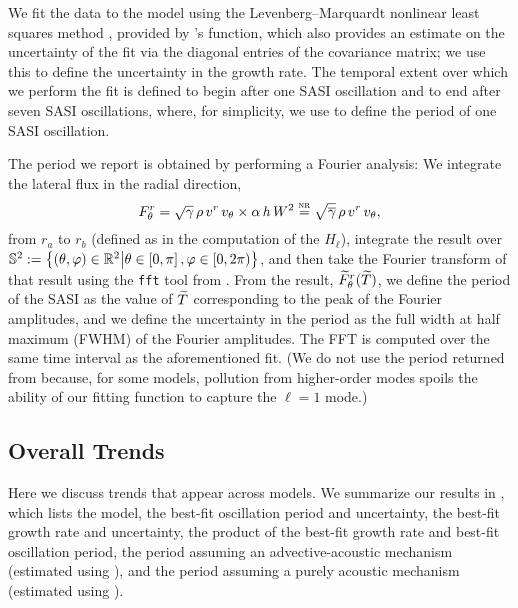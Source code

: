 We fit the data to the model using the Levenberg--Marquardt nonlinear
least squares method \citep[e.g., see][]{m1978},
provided by \scipy 's \curvefit{} function,
which also provides an estimate on the uncertainty of the fit via the diagonal
entries of the covariance matrix; we use this to define the uncertainty
in the growth rate.
The temporal extent over which we perform the fit is defined to begin
after one SASI oscillation and to end after seven SASI oscillations,
where, for simplicity, we use  to define the period of one
SASI oscillation.

The period we report is obtained by performing a Fourier analysis:
We integrate the lateral flux in the radial direction,
\begin{equation}
  F^{r}_{\theta}=\sqrt{\gamma}\,\rho\,v^{r}\,v_{\theta}\times\alpha\,h\,W^{2}
  \stackrel{\textsc{nr}}{=}\sqrt{\overline{\gamma}}\,\rho\,v^{r}\,v_{\theta},
  \label{eq.F12}
\end{equation}
from $r_{a}$ to $r_{b}$ (defined as in the computation of the $H_{\ell}$),
integrate the result over
$\mathbb{S}^{2}:=\left\{\left(\theta,\varphi\right)\in\mathbb{R}^{2}
\big|\theta\in\left[0,\pi\right],\varphi\in\left[0,2\pi\right)\right\}$,
and then take the Fourier transform of that result
using the \texttt{fft} tool from \scipy.
From the result, $\widetilde{F}^{r}_{\theta}(\widetilde{T})$,
we define the period of the SASI as the value of $\widetilde{T}$ corresponding to the
peak of the Fourier amplitudes, and
we define the uncertainty in the period as the
full width at half maximum (FWHM) of the Fourier amplitudes.
The FFT is computed over the same time interval as the aforementioned fit.
(We do not use the period returned from \curvefit{} because,
for some models, pollution from
higher-order modes spoils the ability of our fitting function to capture
the $\ell=1$ mode.)

\subsection{Overall Trends}
\label{sec.models}

Here we discuss trends that appear across  models.
We summarize our results in ,
which lists the model, the best-fit oscillation period and uncertainty,
the best-fit growth rate and uncertainty,
the product of the best-fit growth rate and best-fit oscillation period,
the period assuming an advective-acoustic mechanism\repl{}{, $\taa$}
(estimated using ),
and the period assuming a purely acoustic mechanism\repl{}{, $\tac$}
(estimated using ).


